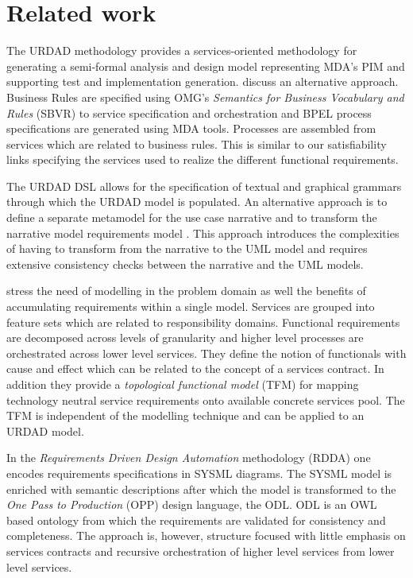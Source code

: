 \section{Related work \label{sec:relatedWork}}

The URDAD methodology provides a services-oriented methodology for generating a semi-formal analysis and design model representing MDA's PIM and supporting test and implementation generation. \cite{iacob_model-driven_2008} discuss an alternative approach. Business Rules are specified using OMG's {\em Semantics for Business Vocabulary and Rules} (SBVR) to service specification and orchestration and BPEL process specifications are generated using MDA tools. Processes are assembled from services which are related to business rules. This is similar to our satisfiability links specifying the services used to realize the different functional requirements.

The URDAD DSL allows for the specification of textual and graphical grammars through which the URDAD model is populated. An alternative approach is to define a separate metamodel for the use case narrative and to transform the narrative model requirements model \cite{hoffmann_towards_2009,osis_transforming_2010}. This approach introduces the complexities of having to transform from the narrative to the UML model and requires extensive consistency checks between the narrative and the UML models.

\cite{asnina_computation_2010} stress the need of modelling in the problem domain as well the benefits of accumulating requirements within a single model. Services are grouped into feature sets which are related to responsibility domains. Functional requirements are decomposed across levels of granularity and higher level processes are orchestrated across lower level services. They define the notion of functionals with cause and effect which can be related to the concept of a services contract. In addition they provide a {\em topological functional model} (TFM) for mapping technology neutral service requirements onto available concrete services pool. The TFM is independent of the modelling technique and can be applied to an URDAD model. 

In the {\em Requirements Driven Design Automation} methodology (RDDA) \cite{cardei_model_2008} one encodes requirements specifications in SYSML diagrams. The SYSML model is enriched with semantic descriptions after which the model is transformed to the {\em One Pass to Production} (OPP) design language, the ODL. ODL is an OWL based ontology from which the requirements are validated for consistency and completeness. The approach is, however, structure focused with little emphasis on services contracts and recursive orchestration of higher level services from lower level services.
